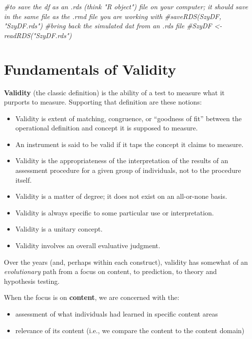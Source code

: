 \documentclass[
  english,
]{book}
\newenvironment{Shaded}{\begin{snugshade}}{\end{snugshade}}
\newcommand{\CommentTok}[1]{\textcolor[rgb]{0.56,0.35,0.01}{\textit{#1}}}
\providecommand{\tightlist}{%
  \setlength{\itemsep}{0pt}\setlength{\parskip}{0pt}}
\begin{document}
\begin{Shaded}
\begin{Highlighting}[]
\CommentTok{#to save the df as an .rds (think "R object") file on your computer; it should save in the same file as the .rmd file you are working with}
\CommentTok{#saveRDS(SzyDF, "SzyDF.rds")}
\CommentTok{#bring back the simulated dat from an .rds file}
\CommentTok{#SzyDF <- readRDS("SzyDF.rds")}
\end{Highlighting}
\end{Shaded}

\hypertarget{fundamentals-of-validity}{%
\section{Fundamentals of Validity}\label{fundamentals-of-validity}}

\textbf{Validity} (the classic definition) is the ability of a test to measure what it purports to measure. Supporting that definition are these notions:

\begin{itemize}
\tightlist
\item
  Validity is extent of matching, congruence, or ``goodness of fit'' between the operational definition and concept it is supposed to measure.
\item
  An instrument is said to be valid if it taps the concept it claims to measure.
\item
  Validity is the appropriateness of the interpretation of the results of an assessment procedure for a given group of individuals, not to the procedure itself.
\item
  Validity is a matter of degree; it does not exist on an all-or-none basis.
\item
  Validity is always specific to some particular use or interpretation.
\item
  Validity is a unitary concept.
\item
  Validity involves an overall evaluative judgment.
\end{itemize}

Over the years (and, perhaps within each construct), validity has somewhat of an \emph{evolutionary} path from a focus on content, to prediction, to theory and hypothesis testing.

When the focus is on \textbf{content}, we are concerned with the:

\begin{itemize}
\tightlist
\item
  assessment of what individuals had learned in specific content areas
\item
  relevance of its content (i.e., we compare the content to the content domain)
\end{itemize}
\end{document}
